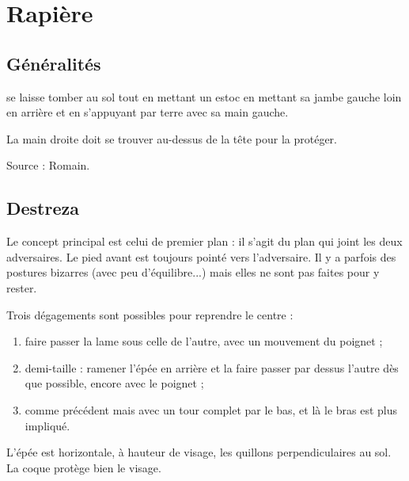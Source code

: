 \chapter{Rapière}


\section{Généralités}


\begin{technique}

\A se laisse tomber au sol tout en mettant un estoc en mettant sa jambe gauche loin en arrière et en s'appuyant par terre avec sa main gauche.

La main droite doit se trouver au-dessus de la tête pour la protéger.

Source : Romain.

\end{technique}


\section{Destreza}


Le concept principal est celui de premier plan : il s'agit du plan qui joint les deux adversaires.
Le pied avant est toujours pointé vers l'adversaire.
Il y a parfois des postures bizarres (avec peu d'équilibre...) mais elles ne sont pas faites pour y rester.

Trois dégagements sont possibles pour reprendre le centre :
\begin{enumerate}
	\it
	\item faire passer la lame sous celle de l'autre, avec un mouvement du poignet ;
	\item demi-taille : ramener l'épée en arrière et la faire passer par dessus l'autre dès que possible, encore avec le poignet ;
	\item comme précédent mais avec un tour complet par le bas, et là le bras est plus impliqué.
\end{enumerate}


\begin{garde}

L'épée est horizontale, à hauteur de visage, les quillons perpendiculaires au sol.
La coque protège bien le visage.

\end{garde}


